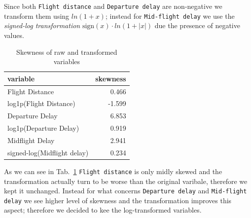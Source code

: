Since both \texttt{Flight distance} and \texttt{Departure delay} are non-negative we transform them using $ln(1+x)$; instead for \texttt{Mid-flight delay} we use the \textit{signed-log transformation} $\text{sign}(x)    \cdot ln(1+|x|)$ due the presence of negative values.
\begin{table}[ht]
\small
\centering
\begin{tabular}{lr}
\hline
\textbf{variable} & \textbf{skewness} \\
\hline
Flight Distance & 0.466 \\
log1p(Flight Distance) & -1.599 \\
Departure Delay & 6.853 \\
log1p(Departure Delay) & 0.919 \\
Midflight Delay & 2.941 \\
signed-log(Midflight delay) & 0.234 \\
\hline
\end{tabular}
\caption{Skewness of raw and transformed variables}
\label{tab:skewness}
\end{table}

As we can see in Tab.~\ref{tab:skewness} \texttt{Flight distance} is only midly skewed and the transformation actually turn to be worse than the original varibale, therefore we kept it unchanged. Instead for what concerns \texttt{Departure delay} and \texttt{Mid-flight delay} we see higher level of skewness and the transformation improves this aspect; therefore we decided to kee the log-transformed variables.


